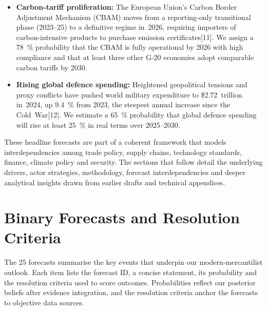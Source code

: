 \documentclass[12pt]{article}
\begin{document}
\begin{itemize}
\item \textbf{Carbon‑tariff proliferation:}  The European Union’s Carbon Border Adjustment Mechanism (CBAM) moves from a reporting‑only transitional phase (2023–25) to a definitive regime in 2026, requiring importers of carbon‑intensive products to purchase emission certificates[11].  We assign a 78 \% probability that the CBAM is fully operational by 2026 with high compliance and that at least three other G‑20 economies adopt comparable carbon tariffs by 2030.

\item \textbf{Rising global defence spending:}  Heightened geopolitical tensions and proxy conflicts have pushed world military expenditure to \$2.72 trillion in 2024, up 9.4 \% from 2023, the steepest annual increase since the Cold War[12].  We estimate a 65 \% probability that global defence spending will rise at least 25 \% in real terms over 2025–2030.
\end{itemize}

These headline forecasts are part of a coherent framework that models interdependencies among trade policy, supply chains, technology standards, finance, climate policy and security.  The sections that follow detail the underlying drivers, actor strategies, methodology, forecast interdependencies and deeper analytical insights drawn from earlier drafts and technical appendices.

\clearpage

\section{Binary Forecasts and Resolution Criteria}

The 25 forecasts summarise the key events that underpin our modern‑mercantilist outlook.  Each item lists the forecast ID, a concise statement, its probability and the resolution criteria used to score outcomes.  Probabilities reflect our posterior beliefs after evidence integration, and the resolution criteria anchor the forecasts to objective data sources.
\end{document}
